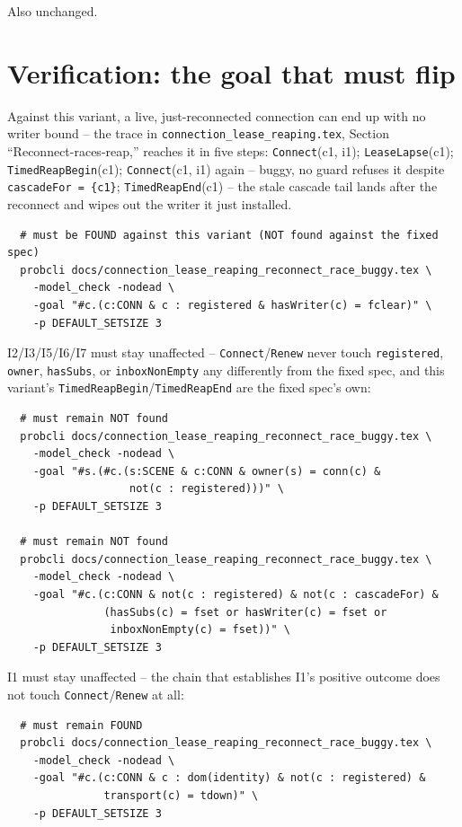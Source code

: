 \documentclass[a4paper,10pt,fleqn]{article}
\begin{document}
Also unchanged.

\section{Verification: the goal that must flip}

Against this variant, a live, just-reconnected connection can end up with
no writer bound -- the trace in
\texttt{connection\_lease\_reaping.tex}, Section
``Reconnect-races-reap,'' reaches it in five steps:
\texttt{Connect}(c1, i1); \texttt{LeaseLapse}(c1);
\texttt{TimedReapBegin}(c1); \texttt{Connect}(c1, i1) again -- buggy, no
guard refuses it despite \texttt{cascadeFor = \{c1\}};
\texttt{TimedReapEnd}(c1) -- the stale cascade tail lands after the
reconnect and wipes out the writer it just installed.

\begin{verbatim}
  # must be FOUND against this variant (NOT found against the fixed spec)
  probcli docs/connection_lease_reaping_reconnect_race_buggy.tex \
    -model_check -nodead \
    -goal "#c.(c:CONN & c : registered & hasWriter(c) = fclear)" \
    -p DEFAULT_SETSIZE 3
\end{verbatim}

I2/I3/I5/I6/I7 must stay unaffected -- \texttt{Connect}/\texttt{Renew}
never touch \texttt{registered}, \texttt{owner}, \texttt{hasSubs}, or
\texttt{inboxNonEmpty} any differently from the fixed spec, and this
variant's \texttt{TimedReapBegin}/\texttt{TimedReapEnd} are the fixed
spec's own:

\begin{verbatim}
  # must remain NOT found
  probcli docs/connection_lease_reaping_reconnect_race_buggy.tex \
    -model_check -nodead \
    -goal "#s.(#c.(s:SCENE & c:CONN & owner(s) = conn(c) &
                   not(c : registered)))" \
    -p DEFAULT_SETSIZE 3

  # must remain NOT found
  probcli docs/connection_lease_reaping_reconnect_race_buggy.tex \
    -model_check -nodead \
    -goal "#c.(c:CONN & not(c : registered) & not(c : cascadeFor) &
               (hasSubs(c) = fset or hasWriter(c) = fset or
                inboxNonEmpty(c) = fset))" \
    -p DEFAULT_SETSIZE 3
\end{verbatim}

I1 must stay unaffected -- the chain that establishes I1's positive
outcome does not touch \texttt{Connect}/\texttt{Renew} at all:

\begin{verbatim}
  # must remain FOUND
  probcli docs/connection_lease_reaping_reconnect_race_buggy.tex \
    -model_check -nodead \
    -goal "#c.(c:CONN & c : dom(identity) & not(c : registered) &
               transport(c) = tdown)" \
    -p DEFAULT_SETSIZE 3
\end{verbatim}
\end{document}
